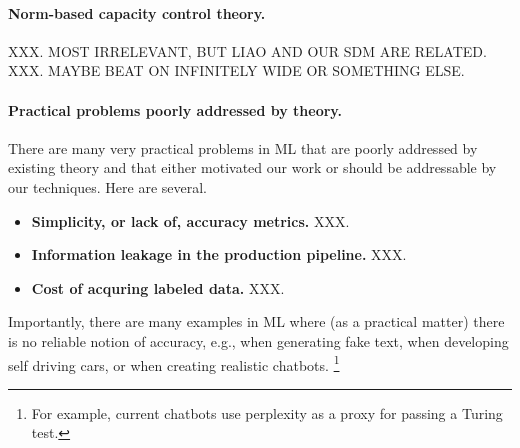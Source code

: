 \paragraph{Norm-based capacity control theory.}
XXX.  MOST IRRELEVANT, BUT LIAO AND OUR SDM ARE RELATED.  
XXX.  MAYBE BEAT ON INFINITELY WIDE OR SOMETHING ELSE.

\paragraph{Practical problems poorly addressed by theory.}
There are many very practical problems in ML that are poorly addressed by existing theory and that either motivated our work or should be addressable by our techniques.
Here are several.
\begin{itemize}
\item
\textbf{Simplicity, or lack of,  accuracy metrics.}
XXX.
\item
\textbf{Information leakage in the production pipeline.}
XXX.
\item
\textbf{Cost of acquring labeled data.}
XXX.
\end{itemize}
Importantly, there are many examples in ML where (as a practical matter) there is no reliable notion of accuracy, e.g., when generating fake text, when developing self driving cars, or when creating realistic chatbots.%
\footnote{For example, current chatbots use perplexity as a proxy for passing a Turing test.}
